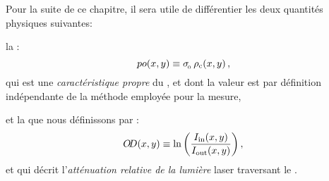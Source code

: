 \casse
%
\noindent
Pour la suite de ce chapitre, il sera utile de différentier les deux quantités physiques suivantes:
\begin{itemizel}
	\item la \emph{\pro} %
%
:
\begin{equation}
	\OptProf\xy \equiv \seceff\,\denscolxy
	\label{eq:DefOptProf}
	\virguleformule
\end{equation}
	qui est une \emph{caractéristique propre} du \nat, et dont la valeur est par définition indépendante de la méthode employée pour la mesure,
	\item et la \emph{\do} que nous définissons par %
%
:
\begin{equation}
	{ O\hspace{-2pt}D}(x,y) 
	\equiv {\ln\left(	\frac{{{{I}_{\rm in}}\ensuremath{(x,y)} }}{{{{I}_{\rm out}}\ensuremath{(x,y)} }}	\right)}
	\, ,
\end{equation}
et qui décrit l'\emph{atténuation relative de la lumière} laser traversant le \n. 
\end{itemizel}



